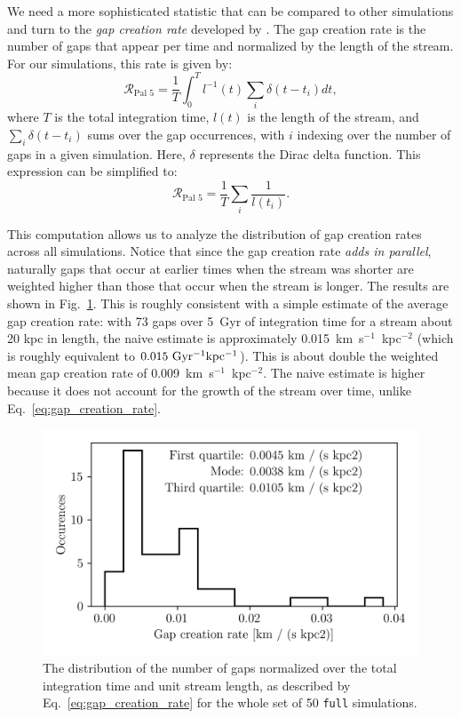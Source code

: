 \documentclass[draft]{aa}
\begin{document}
    We need a more sophisticated statistic that can be compared to other simulations and turn to the \textit{gap creation rate} developed by \citet{2012ApJ...748...20C}. The gap creation rate is the number of gaps that appear per time and normalized by the length of the stream. For our simulations, this rate is given by: \begin{equation} \label{eq:gap_creation_rate} \mathcal{R}_{\textrm{Pal 5}} =  \frac{1}{T}\int_{0}^T l^{-1}(t) \sum_i \delta(t-t_i) dt,\end{equation}where $T$ is the total integration time, $l(t)$ is the length of the stream, and $\sum_i \delta(t-t_i)$ sums over the gap occurrences, with $i$ indexing over the number of gaps in a given simulation. Here, $\delta$ represents the Dirac delta function. This expression can be simplified to:\begin{equation}\mathcal{R}_{\textrm{Pal 5}} =  \frac{1}{T} \sum_i \frac{1}{l (t_i)}. \end{equation}
    
    This computation allows us to analyze the distribution of gap creation rates across all simulations. Notice that since the gap creation rate \textit{adds in parallel}, naturally gaps that occur at earlier times when the stream was shorter are weighted higher than those that occur when the stream is longer. The results are shown in Fig.~\ref{fig:gapcreationrate}. This is roughly consistent with a simple estimate of the average gap creation rate: with 73 gaps over 5~Gyr of integration time for a stream about 20 kpc in length, the naive estimate is approximately 0.015~km~s$^{-1}$~kpc$^{-2} $ (which is roughly equivalent to $0.015~\rm{Gyr^{-1}kpc^{-1}}$). This is about double the weighted mean gap creation rate of 0.009~km~s$^{-1}$~kpc$^{-2}$. The naive estimate is higher because it does not account for the growth of the stream over time, unlike Eq.~\ref{eq:gap_creation_rate}.

    \begin{figure}
      \centering
      \includegraphics[width=\linewidth]{gap_creation_rate.png}
      \caption{The distribution of the number of gaps normalized over the total integration time and unit stream length, as described by Eq.~\ref{eq:gap_creation_rate} for the whole set of 50 \texttt{full} simulations. }
      \label{fig:gapcreationrate}
    \end{figure}
\end{document}

